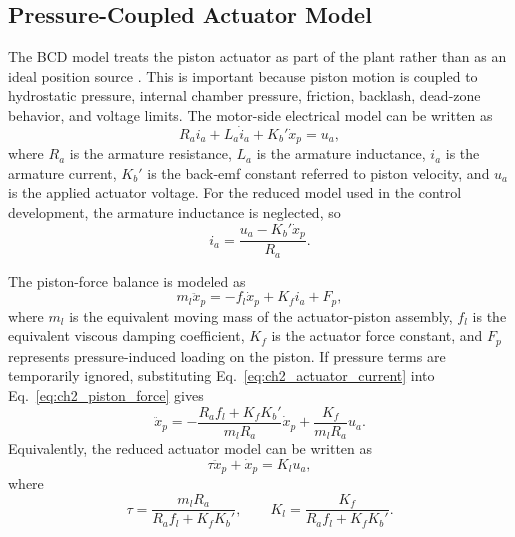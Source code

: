 \documentclass{uhcoethesis}
\begin{document}
\subsection{Pressure-Coupled Actuator Model}

The BCD model treats the piston actuator as part of the plant rather than as an ideal position source \cite{Masood2026ESCBCD}. This is important because piston motion is coupled to hydrostatic pressure, internal chamber pressure, friction, backlash, dead-zone behavior, and voltage limits. The motor-side electrical model can be written as
\begin{equation}
    R_a i_a + L_a \dot{i}_a + K_b'\dot{x}_p = u_a ,
    \label{eq:ch2_actuator_electrical}
\end{equation}
where $R_a$ is the armature resistance, $L_a$ is the armature inductance, $i_a$ is the armature current, $K_b'$ is the back-emf constant referred to piston velocity, and $u_a$ is the applied actuator voltage. For the reduced model used in the control development, the armature inductance is neglected, so
\begin{equation}
    i_a = \frac{u_a - K_b'\dot{x}_p}{R_a}.
    \label{eq:ch2_actuator_current}
\end{equation}

The piston-force balance is modeled as
\begin{equation}
    m_l\ddot{x}_p = -f_l\dot{x}_p + K_f i_a + F_p ,
    \label{eq:ch2_piston_force}
\end{equation}
where $m_l$ is the equivalent moving mass of the actuator-piston assembly, $f_l$ is the equivalent viscous damping coefficient, $K_f$ is the actuator force constant, and $F_p$ represents pressure-induced loading on the piston. If pressure terms are temporarily ignored, substituting Eq.~\eqref{eq:ch2_actuator_current} into Eq.~\eqref{eq:ch2_piston_force} gives
\begin{equation}
    \ddot{x}_p =
    -\frac{R_a f_l + K_f K_b'}{m_l R_a}\dot{x}_p
    + \frac{K_f}{m_l R_a}u_a .
    \label{eq:ch2_basic_actuator_model}
\end{equation}
Equivalently, the reduced actuator model can be written as
\begin{equation}
    \tau \ddot{x}_p + \dot{x}_p = K_l u_a ,
    \label{eq:ch2_tau_actuator}
\end{equation}
where
\begin{equation}
    \tau = \frac{m_l R_a}{R_a f_l + K_f K_b'}, \qquad
    K_l = \frac{K_f}{R_a f_l + K_f K_b'} .
    \label{eq:ch2_tau_kl}
\end{equation}
\end{document}
